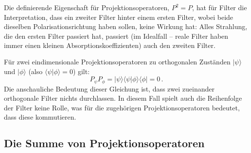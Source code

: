 Die definierende Eigenschaft f\"ur Projektionsoperatoren, $P^2=P$, hat f\"ur Filter die Interpretation,
dass ein zweiter Filter hinter einem ersten Filter, wobei beide dieselben Polarisationsrichtung haben
sollen, keine Wirkung hat: Alles Strahlung, die den ersten Filter passiert hat, passiert (im Idealfall --
reale Filter haben immer einen kleinen Absorptionskoeffizienten) auch den zweiten Filter. 

F\"ur zwei eindimensionale Projektionsoperatoren zu orthogonalen Zust\"anden $|\psi\rangle$ und $|\phi\rangle$
(also $\langle \psi|\phi \rangle =0$) gilt:
\begin{equation}
            P_\psi P_\phi = | \psi \rangle \langle \psi | \phi \rangle \langle \phi | = 0 \, .             
\end{equation}
Die anschauliche Bedeutung dieser Gleichung ist, dass zwei zueinander orthogonale Filter nichts durchlassen. 
In diesem Fall spielt auch die Reihenfolge der Filter keine Rolle, was f\"ur die zugeh\"origen
Projektionsoperatoren bedeutet, dass diese kommutieren. 

\subsection{Die Summe von Projektionsoperatoren}
\label{sec_BK_SP}

